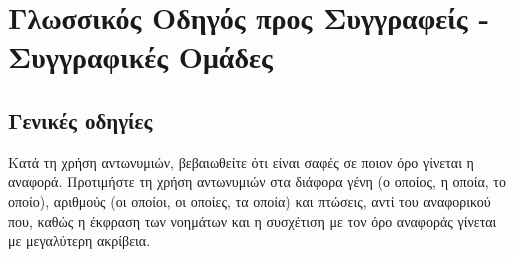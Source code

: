 \chapter{Γλωσσικός Οδηγός προς Συγγραφείς - Συγγραφικές Ομάδες}\label{chap:lang-guide}

\section{Γενικές οδηγίες}
Κατά τη χρήση αντωνυμιών, βεβαιωθείτε ότι είναι σαφές σε ποιον όρο γίνεται η
αναφορά. Προτιμήστε τη χρήση αντωνυμιών στα διάφορα γένη (ο οποίος, η οποία, το
οποίο), αριθμούς (οι οποίοι, οι οποίες, τα οποία) και πτώσεις, αντί του αναφορικού που,
καθώς η έκφραση των νοημάτων και η συσχέτιση με τον όρο αναφοράς γίνεται με
μεγαλύτερη ακρίβεια.
